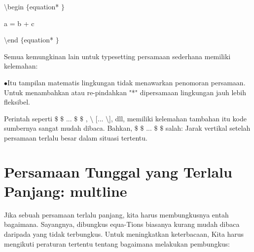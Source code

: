 \vspace{12pt}
\noindent 
 $  \setminus  $begin $  \{  $equation* $  \}  $ \par
\vspace{12pt}
\noindent 
a = b + c \par
\vspace{12pt}
\noindent 
 $  \setminus  $end $  \{  $equation* $  \}  $ \par
\vspace{12pt}
\noindent 
Semua kemungkinan lain untuk typesetting persamaan sederhana memiliki kelemahan: \par
\noindent 
  $ \bullet $Itu tampilan matematis lingkungan tidak menawarkan penomoran persamaan. Untuk menambahkan atau re-pindahkan "*" dipersamaan lingkungan jauh lebih fleksibel.
 \par
\noindent 

 Perintah seperti  $  \$  $ $  \$  $ ...  $  \$  $ $  \$  $ , $  \setminus  $ [...  $  \setminus  $], dll, memiliki kelemahan tambahan itu kode sumbernya sangat mudah dibaca. Bahkan,  $  \$  $ $  \$  $ ...  $  \$  $ $  \$  $ salah: Jarak vertikal setelah persamaan terlalu besar dalam situasi tertentu. \par
\vspace{12pt}
\noindent 
\section {Persamaan Tunggal yang Terlalu Panjang: multline} 

\noindent 
 \hspace*{0.5in} Jika sebuah persamaan terlalu panjang, kita harus membungkusnya entah bagaimana. Sayangnya, dibungkus equa-Tions biasanya kurang mudah dibaca daripada yang tidak terbungkus. Untuk meningkatkan keterbacaan, Kita harus mengikuti peraturan tertentu tentang bagaimana melakukan pembungkus: \par
\noindent 

